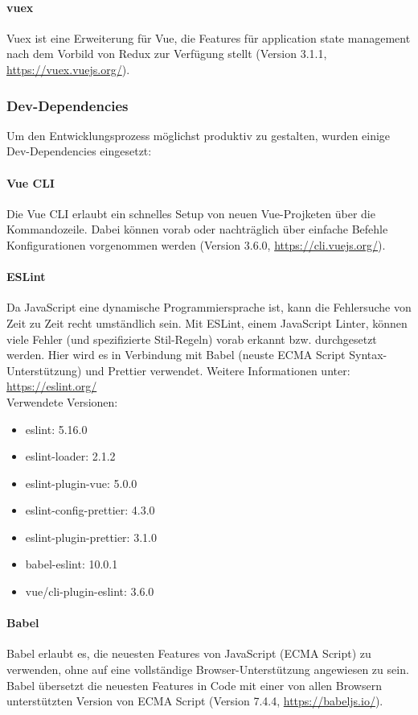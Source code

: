 	\paragraph{vuex}
	Vuex ist eine Erweiterung für Vue, die Features für application state management nach dem Vorbild von Redux zur Verfügung stellt (Version 3.1.1, \url{https://vuex.vuejs.org/}).

\subsubsection{Dev-Dependencies}
Um den Entwicklungsprozess möglichst produktiv zu gestalten, wurden einige Dev-Dependencies eingesetzt:

	\paragraph{Vue CLI}
	Die Vue CLI erlaubt ein schnelles Setup von neuen Vue-Projketen über die Kommandozeile. Dabei können vorab oder nachträglich über einfache Befehle Konfigurationen vorgenommen werden (Version 3.6.0, \url{https://cli.vuejs.org/}).

	\paragraph{ESLint}
	Da JavaScript eine dynamische Programmiersprache ist, kann die Fehlersuche von Zeit zu Zeit recht umständlich sein.
Mit ESLint, einem JavaScript Linter, können viele Fehler (und spezifizierte Stil-Regeln) vorab erkannt bzw. durchgesetzt werden. Hier wird es in Verbindung mit Babel (neuste ECMA Script Syntax-Unterstützung) und Prettier verwendet. Weitere Informationen unter: \url{https://eslint.org/}\\
Verwendete Versionen:
	\begin{itemize}
		\item eslint: 5.16.0
		\item eslint-loader: 2.1.2
		\item eslint-plugin-vue: 5.0.0
		\item eslint-config-prettier: 4.3.0
		\item eslint-plugin-prettier: 3.1.0
		\item babel-eslint: 10.0.1
		\item vue/cli-plugin-eslint: 3.6.0
	\end{itemize}

	\paragraph{Babel}
	Babel erlaubt es, die neuesten Features von JavaScript (ECMA Script) zu verwenden, ohne auf eine vollständige Browser-Unterstützung angewiesen zu sein. Babel übersetzt die neuesten Features in Code mit einer von allen Browsern unterstützten Version von ECMA Script (Version 7.4.4, \url{https://babeljs.io/}).
	
